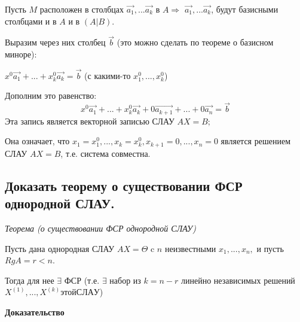 Пусть $M$ расположен в столбцах $\vec{a_1},...\vec{a_k}$ в $A \Rightarrow$ $\vec{a_1},...\vec{a_k}$, будут базисными столбцами и в $A$ и в $(A|B)$.

Выразим через них столбец $\vec{b}$ (это можно сделать по теореме о базисном миноре):

$x^0\vec{a_1}+...+x^0_k\vec{a_k} = \vec{b}$ (с какими-то $x^0_1, ..., x^0_k$)

Дополним это равенство:
$$x^0\vec{a_1}+...+x^0_k\vec{a_k} +0\vec{a_{k+1}}+...+0\vec{a_n} = \vec{b}$$
Эта запись является векторной записью СЛАУ $AX = B;$

Она означает, что $x_1 = x^0_1, ..., x_k = x^0_k, x_{k+1} = 0, ..., x_n = 0$ является решением СЛАУ $AX = B$, т.е. система совместна.

\ep

\subsection{Доказать теорему о существовании ФСР однородной СЛАУ.}

\textit{Теорема (о существовании ФСР однородной СЛАУ)}

\vspace*{15pt}

Пусть дана однородная СЛАУ $AX = \Theta$ c $n$ неизвестными $x_1, ..., x_n,$ и пусть $RgA = r < n$.

Тогда для нее $\exists$ ФСР (т.е. $\exists$ набор из $k = n - r$ линейно независимых решений $X^{(1)}, ..., X^{(k)} этой СЛАУ$)

\vspace*{15pt}

{\bf{Доказательство}}

